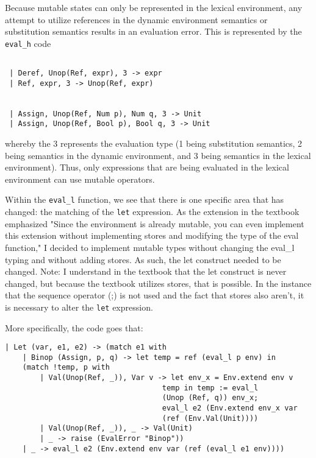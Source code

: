 \documentclass{article}
\def\code#1{\texttt{#1}}
\begin{document}
 Because mutable states can only be represented in the lexical environment, any attempt to utilize references in the dynamic environment semantics or substitution semantics results in an evaluation error. This is represented by the \code{eval\_h} code 
 \begin{verbatim}
 
 | Deref, Unop(Ref, expr), 3 -> expr
 | Ref, expr, 3 -> Unop(Ref, expr)
 
  
 | Assign, Unop(Ref, Num p), Num q, 3 -> Unit
 | Assign, Unop(Ref, Bool p), Bool q, 3 -> Unit 

\end{verbatim}
whereby the 3 represents the evaluation type (1 being substitution semantics, 2 being semantics in the dynamic environment, and 3 being semantics in the lexical environment). Thus, only expressions that are being evaluated in the lexical environment can use mutable operators. 

Within the \code{eval\_l} function, we see that there is one specific area that has changed: the matching of the \code{let} expression. As the extension in the textbook emphasized "Since the environment is already mutable, you can even implement this extension without implementing stores and modifying the type of the eval function," I decided to implement mutable types without changing the eval\_l typing and without adding stores. As such, the let construct needed to be changed. Note: I understand in the textbook that the let construct is never changed, but because the textbook utilizes stores, that is possible. In the instance that the sequence operator (;) is not used and the fact that stores also aren't, it is necessary to alter the \code{let} expression. 

More specifically, the code goes that: \\
\begin{verbatim}
| Let (var, e1, e2) -> (match e1 with  
    | Binop (Assign, p, q) -> let temp = ref (eval_l p env) in 
    (match !temp, p with 
        | Val(Unop(Ref, _)), Var v -> let env_x = Env.extend env v 
                                    temp in temp := eval_l 
                                    (Unop (Ref, q)) env_x; 
                                    eval_l e2 (Env.extend env_x var 
                                    (ref (Env.Val(Unit)))) 
        | Val(Unop(Ref, _)), _ -> Val(Unit) 
        | _ -> raise (EvalError "Binop"))
    | _ -> eval_l e2 (Env.extend env var (ref (eval_l e1 env))))
\end{verbatim}
\end{document}
